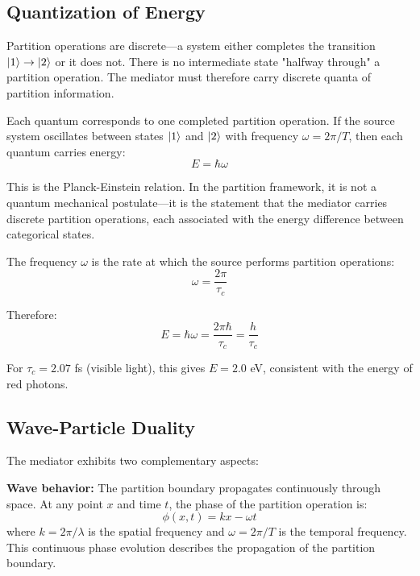 \documentclass[twocolumn,superscriptaddress,prb,10pt]{revtex4-2}
\begin{document}
\subsection{Quantization of Energy}

Partition operations are discrete—a system either completes the transition $\ket{1} \to \ket{2}$ or it does not. There is no intermediate state "halfway through" a partition operation. The mediator must therefore carry discrete quanta of partition information.

Each quantum corresponds to one completed partition operation. If the source system oscillates between states $\ket{1}$ and $\ket{2}$ with frequency $\omega = 2\pi/T$, then each quantum carries energy:
\begin{equation}
E = \hbar \omega
\label{eq:photon_energy}
\end{equation}

This is the Planck-Einstein relation. In the partition framework, it is not a quantum mechanical postulate—it is the statement that the mediator carries discrete partition operations, each associated with the energy difference between categorical states.

The frequency $\omega$ is the rate at which the source performs partition operations:
\begin{equation}
\omega = \frac{2\pi}{\tau_c}
\label{eq:omega_partition}
\end{equation}

Therefore:
\begin{equation}
E = \hbar \omega = \frac{2\pi \hbar}{\tau_c} = \frac{h}{\tau_c}
\label{eq:energy_lag}
\end{equation}

For $\tau_c = 2.07$ fs (visible light), this gives $E = 2.0$ eV, consistent with the energy of red photons.

\subsection{Wave-Particle Duality}

The mediator exhibits two complementary aspects:

\textbf{Wave behavior:} The partition boundary propagates continuously through space. At any point $x$ and time $t$, the phase of the partition operation is:
\begin{equation}
\phi(x,t) = kx - \omega t
\label{eq:phase}
\end{equation}
where $k = 2\pi/\lambda$ is the spatial frequency and $\omega = 2\pi/T$ is the temporal frequency. This continuous phase evolution describes the propagation of the partition boundary.
\end{document}
